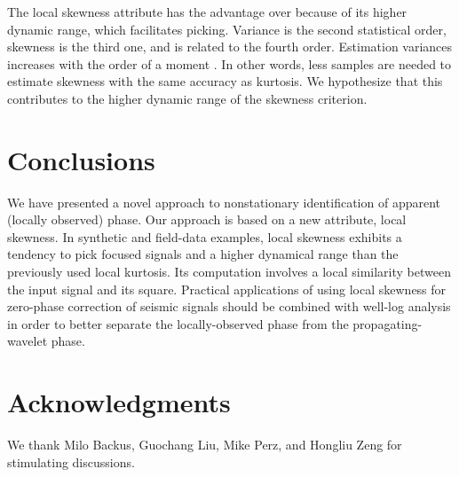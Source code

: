 The local skewness attribute has the advantage over   
because of its higher dynamic range, which facilitates
picking. Variance is the second statistical order, skewness is the
third one, and   is related to the fourth
order. Estimation variances increases with the order of a
moment \cite[]{Mend91}. In other words, less samples are needed to
estimate skewness with the same accuracy as  kurtosis.
We hypothesize that this contributes to the higher dynamic range
of the skewness criterion.

\section{Conclusions}
We have presented a novel approach to nonstationary identification of
apparent (locally observed) phase. Our approach is based on a new
attribute, local skewness. In synthetic and field-data examples, local
skewness exhibits a tendency to pick focused signals and a higher
dynamical range than the previously used local kurtosis. Its
computation involves a local similarity between the input signal and
its square. Practical applications of using local skewness for
zero-phase correction of seismic signals should be combined with
well-log analysis in order to better separate the locally-observed
phase from the propagating-wavelet phase.

\section{Acknowledgments}
We thank Milo Backus, Guochang Liu, Mike Perz, and Hongliu Zeng for
stimulating discussions.

\clearpage



